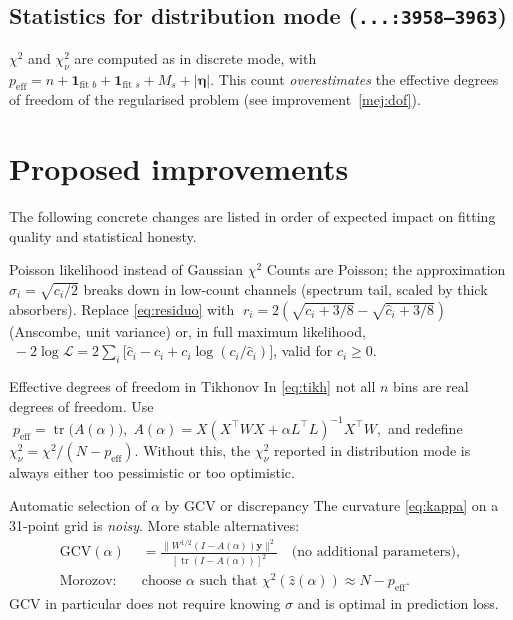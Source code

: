 \documentclass[11pt,a4paper]{article}
\newcommand{\file}[1]{\textcolor{black!70}{\texttt{\small #1}}}
\DeclareMathOperator{\tr}{tr}
\begin{document}
\subsection{Statistics for distribution mode (\file{...:3958--3963})}
$\chi^{2}$ and $\chi^{2}_\nu$ are computed as in discrete mode, with $p_{\text{eff}}=n+\mathbf 1_{\text{fit }b}+\mathbf 1_{\text{fit }s}+M_s+|\bm\eta|$. This count \emph{overestimates} the effective degrees of freedom of the regularised problem (see improvement~\ref{mej:dof}).

\section{Proposed improvements}\label{sec:mej}

The following concrete changes are listed in order of expected impact on fitting quality and statistical honesty.

\begin{mejora}{Poisson likelihood instead of Gaussian $\chi^{2}$}\label{mej:poisson}
Counts are Poisson; the approximation $\sigma_i=\sqrt{c_i/2}$ breaks down in low-count channels (spectrum tail, scaled by thick absorbers). Replace \eqref{eq:residuo} with
\(\;r_i = 2(\sqrt{c_i+3/8}-\sqrt{\hat c_i+3/8})\;\) (Anscombe, unit variance) or, in full maximum likelihood,
\(\;-2\log\mathcal L = 2\sum_i\bigl[\hat c_i - c_i + c_i\log(c_i/\hat c_i)\bigr]\), valid for $c_i\ge 0$.
\end{mejora}

\begin{mejora}{Effective degrees of freedom in Tikhonov}\label{mej:dof}
In \eqref{eq:tikh} not all $n$ bins are real degrees of freedom. Use
\(\;p_{\text{eff}} = \tr\bigl(A(\alpha)\bigr),\;A(\alpha)=X(X^\top W X+\alpha L^\top L)^{-1}X^\top W,\)
and redefine $\chi^{2}_\nu=\chi^{2}/(N-p_{\text{eff}})$. Without this, the $\chi^{2}_\nu$ reported in distribution mode is always either too pessimistic or too optimistic.
\end{mejora}

\begin{mejora}{Automatic selection of $\alpha$ by GCV or discrepancy}\label{mej:alpha}
The curvature \eqref{eq:kappa} on a 31-point grid is \emph{noisy}. More stable alternatives:
\begin{align*}
  \mathrm{GCV}(\alpha) &= \frac{\|W^{1/2}(I-A(\alpha))\bm y\|^{2}}{[\tr(I-A(\alpha))]^{2}}\quad\text{(no additional parameters)},\\
  \text{Morozov:}\quad &\text{choose }\alpha\text{ such that }\chi^{2}(\hat z(\alpha))\approx N-p_{\text{eff}}.
\end{align*}
GCV in particular does not require knowing $\sigma$ and is optimal in prediction loss.
\end{mejora}
\end{document}
